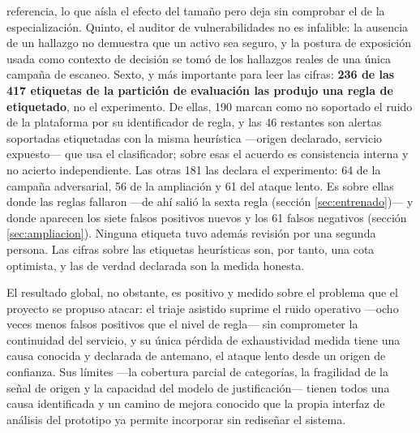 referencia, lo que aísla el efecto del tamaño pero deja sin comprobar el de la especialización. Quinto, el auditor de vulnerabilidades no es infalible: la ausencia de un
hallazgo no demuestra que un activo sea seguro, y la postura de exposición usada como contexto de
decisión se tomó de los hallazgos reales de una única campaña de escaneo. Sexto, y más importante
para leer las cifras: \textbf{236 de las 417 etiquetas de la partición de evaluación las produjo
una regla de etiquetado}, no el experimento. De ellas, 190 marcan como no soportado el ruido de la
plataforma por su identificador de regla, y las 46 restantes son alertas soportadas etiquetadas con
la misma heurística ---origen declarado, servicio expuesto--- que usa el clasificador; sobre esas el
acuerdo es consistencia interna y no acierto independiente. Las otras 181 las declara el
experimento: 64 de la campaña adversarial, 56 de la ampliación y 61 del ataque lento. Es sobre
ellas donde las reglas fallaron ---de ahí salió la sexta regla (sección \ref{sec:entrenado})--- y
donde aparecen los siete falsos positivos nuevos y los 61 falsos negativos (sección
\ref{sec:ampliacion}). Ninguna etiqueta tuvo además revisión por una segunda persona. Las cifras
sobre las etiquetas heurísticas son, por tanto, una cota optimista, y las de verdad declarada son
la medida honesta.

El resultado global, no obstante, es positivo y medido sobre el problema que el proyecto se propuso
atacar: el triaje asistido suprime el ruido operativo ---ocho veces menos falsos positivos que el
nivel de regla--- sin comprometer la continuidad del servicio, y su única pérdida de exhaustividad
medida tiene una causa conocida y declarada de antemano, el ataque lento desde un origen de
confianza. Sus límites ---la cobertura parcial de categorías, la fragilidad de la señal de origen y
la capacidad del modelo de justificación--- tienen todos una causa identificada y un camino de mejora conocido que la propia interfaz de análisis del prototipo
ya permite incorporar sin rediseñar el sistema.
